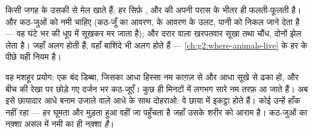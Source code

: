 \begin{proposition}[परिस्थितियाँ बाशिंदे तय करती हैं]\label{prop:g6:exploring-our-environment:decide}
किसी जगह के  उसकी  से मेल खाते हैं: हर  सिर्फ़
,  और  की अपनी परास के भीतर ही फलती-फूलती है।  और
कठ-जुओं को नमी चाहिए (कठ-जूँ का आवरण,  के आवरण के उलट, पानी को निकल
जाने देता है --- वह घंटे भर की धूप में सूखकर मर जाता है); और दरार वाला
खरपतवार सूखा तथा चौंध, दोनों झेल लेता है। जहाँ  अलग होती
हैं, वहाँ बाशिंदे भी अलग होते हैं --- \cref{ch:g2:where-animals-live}
के हर  के पीछे यही नियम है।
\end{proposition}
\admitted

\begin{example}[कठ-जूँ चुनाव-प्रयोग]\label{ex:g6:exploring-our-environment:chooser}
वह मशहूर प्रयोग: एक बंद डिब्बा, जिसका आधा हिस्सा नम काग़ज़ से और आधा
सूखे से ढका हो, और बीच की रेखा पर छोड़े गए दर्जन भर कठ-जूएँ। कुछ ही
मिनटों में लगभग सारे नम तरफ़ आ जाते हैं। अब इसे छायादार आधे बनाम उजाले
वाले आधे के साथ दोहराओ: वे छाया में इकट्ठा होते हैं। कोई उन्हें हाँक
नहीं रहा --- हर  घूमता और मुड़ता हुआ वहीं जा पहुँचता है जहाँ उसके
शरीर को आराम है। कठ-जुओं का नक़्शा असल में नमी का ही नक़्शा \emph{है}।
\end{example}

